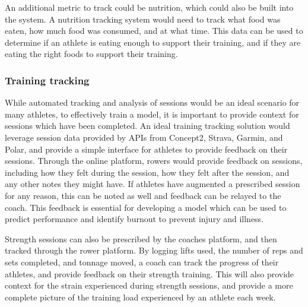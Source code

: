 An additional metric to track could be nutrition, which could also be built into the system. A nutrition tracking system would need to track what food was eaten, how much food was consumed, and at what time. This data can be used to determine if an athlete is eating enough to support their training, and if they are eating the right foods to support their training.

\subsubsection{Training tracking}
While automated tracking and analysis of sessions would be an ideal scenario for many athletes, to effectively train a model, it is important to provide context for sessions which have been completed. An ideal training tracking solution would leverage session data provided by APIs from Concept2, Strava, Garmin, and Polar, and provide a simple interface for athletes to provide feedback on their sessions. Through the online platform, rowers would provide feedback on sessions, including how they felt during the session, how they felt after the session, and any other notes they might have. If athletes have augmented a prescribed session for any reason, this can be noted as well and feedback can be relayed to the coach. This feedback is essential for developing a model which can be used to predict performance and identify burnout to prevent injury and illness.

Strength sessions can also be prescribed by the coaches platform, and then tracked through the rower platform. By logging lifts used, the number of reps and sets completed, and tonnage moved, a coach can track the progress of their athletes, and provide feedback on their strength training. This will also provide context for the strain experienced during strength sessions, and provide a more complete picture of the training load experienced by an athlete each week.

